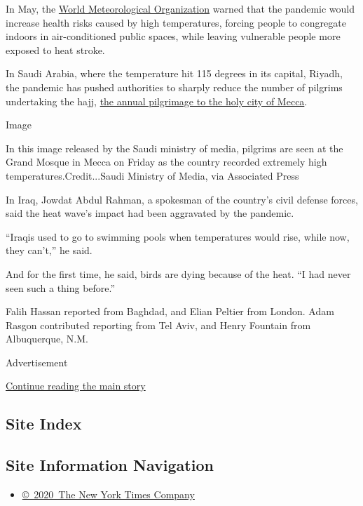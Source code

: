 In May, the
\href{https://public.wmo.int/en/media/news/global-partnership-urges-stronger-preparation-hot-weather-during-covid-19}{World
Meteorological Organization} warned that the pandemic would increase
health risks caused by high temperatures, forcing people to congregate
indoors in air-conditioned public spaces, while leaving vulnerable
people more exposed to heat stroke.

In Saudi Arabia, where the temperature hit 115 degrees in its capital,
Riyadh, the pandemic has pushed authorities to sharply reduce the number
of pilgrims undertaking the hajj,
\href{https://www.nytimes3xbfgragh.onion/2020/07/30/world/middleeast/pilgrims-hajj-mecca-coronavirus-pandemic.html}{the
annual pilgrimage to the holy city of Mecca}.

Image

In this image released by the Saudi ministry of media, pilgrims are seen
at the Grand Mosque in Mecca on Friday as the country recorded extremely
high temperatures.Credit...Saudi Ministry of Media, via Associated Press

In Iraq, Jowdat Abdul Rahman, a spokesman of the country's civil defense
forces, said the heat wave's impact had been aggravated by the pandemic.

``Iraqis used to go to swimming pools when temperatures would rise,
while now, they can't,'' he said.

And for the first time, he said, birds are dying because of the heat.
``I had never seen such a thing before.''

Falih Hassan reported from Baghdad, and Elian Peltier from London. Adam
Rasgon contributed reporting from Tel Aviv, and Henry Fountain from
Albuquerque, N.M.

Advertisement

\protect\hyperlink{after-bottom}{Continue reading the main story}

\hypertarget{site-index}{%
\subsection{Site Index}\label{site-index}}

\hypertarget{site-information-navigation}{%
\subsection{Site Information
Navigation}\label{site-information-navigation}}

\begin{itemize}
\tightlist
\item
  \href{https://help.nytimes3xbfgragh.onion/hc/en-us/articles/115014792127-Copyright-notice}{©~2020~The
  New York Times Company}
\end{itemize}

